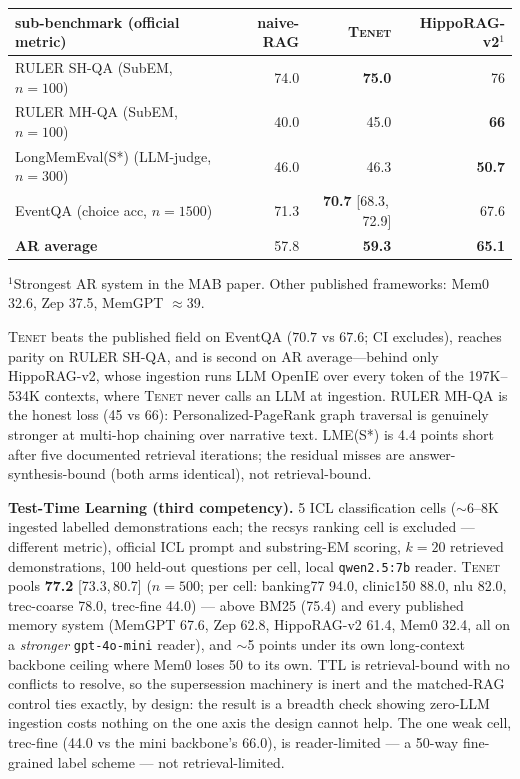 \documentclass[11pt]{article}
\newcommand{\tenet}{\textsc{Tenet}}
\newcommand{\ci}[2]{{\footnotesize[#1,\,#2]}}
\begin{document}
\begin{center}
\small
\begin{tabular}{lrrr}
\toprule
sub-benchmark (official metric) & naive-RAG & \tenet{} & HippoRAG-v2$^{1}$\\
\midrule
RULER SH-QA (SubEM, $n{=}100$) & 74.0 & \textbf{75.0} & 76\\
RULER MH-QA (SubEM, $n{=}100$) & 40.0 & 45.0 & \textbf{66}\\
LongMemEval(S*) (LLM-judge, $n{=}300$) & 46.0 & 46.3 & \textbf{50.7}\\
EventQA (choice acc, $n{=}1500$) & 71.3 & \textbf{70.7} \ci{68.3}{72.9} & 67.6\\
\midrule
\textbf{AR average} & 57.8 & \textbf{59.3} & \textbf{65.1}\\
\bottomrule
\end{tabular}

$^{1}$Strongest AR system in the MAB paper. Other published frameworks: Mem0 32.6,
Zep 37.5, MemGPT $\approx$39.
\end{center}

\tenet{} beats the published field on EventQA ($70.7$ vs $67.6$; CI excludes), reaches
parity on RULER SH-QA, and is second on AR average---behind only HippoRAG-v2, whose
ingestion runs LLM OpenIE over every token of the 197K--534K contexts, where \tenet{}
never calls an LLM at ingestion. RULER MH-QA is the honest loss (45 vs 66):
Personalized-PageRank graph traversal is genuinely stronger at multi-hop chaining over
narrative text. LME(S*) is 4.4 points short after five documented retrieval iterations;
the residual misses are answer-synthesis-bound (both arms identical), not
retrieval-bound.

\textbf{Test-Time Learning (third competency).} 5 ICL classification cells
($\sim$6--8K ingested labelled demonstrations each; the recsys ranking cell is excluded
--- different metric), official ICL prompt and substring-EM scoring, $k{=}20$ retrieved
demonstrations, 100 held-out questions per cell, local \texttt{qwen2.5:7b} reader.
\tenet{} pools \textbf{77.2} \ci{73.3}{80.7} ($n{=}500$; per cell: banking77 94.0,
clinic150 88.0, nlu 82.0, trec-coarse 78.0, trec-fine 44.0) --- above BM25 (75.4) and
every published memory system (MemGPT 67.6, Zep 62.8, HippoRAG-v2 61.4, Mem0 32.4,
all on a \emph{stronger} \texttt{gpt-4o-mini} reader), and $\sim$5 points under its own
long-context backbone ceiling where Mem0 loses 50 to its own. TTL is retrieval-bound
with no conflicts to resolve, so the supersession machinery is inert and the
matched-RAG control ties exactly, by design: the result is a breadth check showing
zero-LLM ingestion costs nothing on the one axis the design cannot help. The one weak
cell, trec-fine (44.0 vs the mini backbone's 66.0), is reader-limited --- a 50-way
fine-grained label scheme --- not retrieval-limited.
\end{document}
